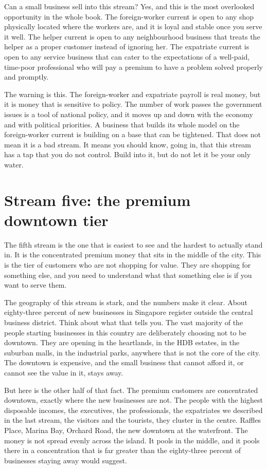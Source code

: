 \documentclass[10pt,twoside,openany]{memoir}
\newcommand{\needspacehead}{\needspace{4\baselineskip}}
\let\oldsection\section
\renewcommand{\section}{\needspacehead\oldsection}
\begin{document}
{{{{{{{{{{{{{{Can a small business sell into this stream? Yes, and this is the most
overlooked opportunity in the whole book. The foreign-worker current is
open to any shop physically located where the workers are, and it is
loyal and stable once you serve it well. The helper current is open to
any neighbourhood business that treats the helper as a proper customer
instead of ignoring her. The expatriate current is open to any service
business that can cater to the expectations of a well-paid, time-poor
professional who will pay a premium to have a problem solved properly
and promptly.

The warning is this. The foreign-worker and expatriate payroll is real
money, but it is money that is sensitive to policy. The number of work
passes the government issues is a tool of national policy, and it moves
up and down with the economy and with political priorities. A business
that builds its whole model on the foreign-worker current is building on
a base that can be tightened. That does not mean it is a bad stream. It
means you should know, going in, that this stream has a tap that you do
not control. Build into it, but do not let it be your only water.

\section{Stream five: the premium downtown
tier}\label{stream-five-the-premium-downtown-tier}

The fifth stream is the one that is easiest to see and the hardest to
actually stand in. It is the concentrated premium money that sits in the
middle of the city. This is the tier of customers who are not shopping
for value. They are shopping for something else, and you need to
understand what that something else is if you want to serve them.

The geography of this stream is stark, and the numbers make it clear.
About eighty-three percent of new businesses in Singapore register
outside the central business district. Think about what that tells you.
The vast majority of the people starting businesses in this country are
deliberately choosing not to be downtown. They are opening in the
heartlands, in the HDB estates, in the suburban malls, in the industrial
parks, anywhere that is not the core of the city. The downtown is
expensive, and the small business that cannot afford it, or cannot see
the value in it, stays away.

But here is the other half of that fact. The premium customers are
concentrated downtown, exactly where the new businesses are not. The
people with the highest disposable incomes, the executives, the
professionals, the expatriates we described in the last stream, the
visitors and the tourists, they cluster in the centre. Raffles Place,
Marina Bay, Orchard Road, the new downtown at the waterfront. The money
is not spread evenly across the island. It pools in the middle, and it
pools there in a concentration that is far greater than the eighty-three
percent of businesses staying away would suggest.

}}}}}}}}}}}}}}
\end{document}
